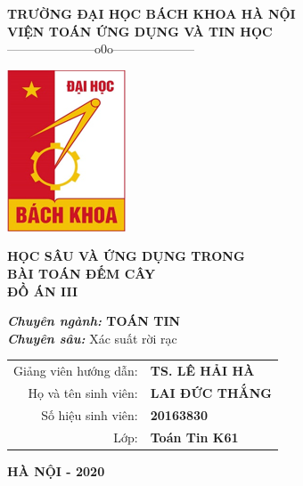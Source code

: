 \documentclass[a4paper, 12pt]{report}
\begin{document}
	\begin{titlepage} %


			\begin{center}
				
				{\large\bf TRƯỜNG ĐẠI HỌC BÁCH KHOA HÀ NỘI}\\
				
				{\large\bf VIỆN TOÁN ỨNG DỤNG VÀ TIN HỌC} \\
				
				{———————o0o——————–}
				\vskip 1cm
				\begin{center}
     				\includegraphics[scale=.85]{Images/biaDA.png}
				\end{center}
				\vskip 1cm
				

				{\Large\bf \textbf{HỌC SÂU
						VÀ ỨNG DỤNG TRONG\\ BÀI TOÁN ĐẾM CÂY\\
				}}
				\vskip 1cm
				{\bf ĐỒ ÁN III}
				
				
				{\bf {\it Chuyên ngành:} TOÁN TIN}\\
				{\bf {\it Chuyên sâu:} }Xác suất rời rạc
				
				\vskip 1cm
				
				\begin{tabular}{r l}
					
					Giảng viên hướng dẫn:&{\bf TS.  LÊ HẢI HÀ  }\\[0.5cm]
					
					Họ và tên sinh viên:&{\bf LAI ĐỨC THẮNG}\\[0.5cm]
					
					Số hiệu sinh viên:&{\bf 20163830}\\[0.5cm]
					Lớp:&{\bf Toán Tin K61}
					
				\end{tabular}
				
				\vfill
				
				{\bf HÀ NỘI - 2020}
				
			\end{center}
			
	\end{titlepage}
\tableofcontents{}
\end{document}
